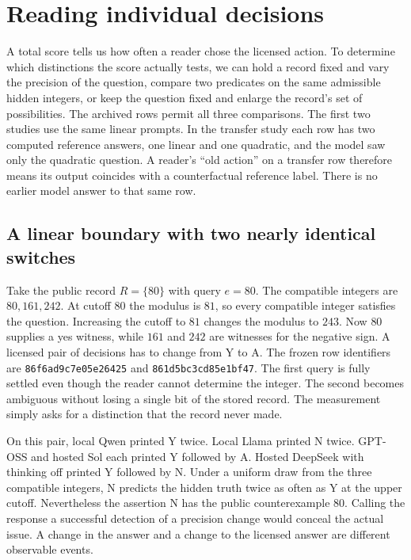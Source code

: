 \documentclass[12pt,letterpaper]{article}
\begin{document}
\section{Reading individual decisions}
\label{sec:reader-decisions}

A total score tells us how often a reader chose the licensed action. To determine which distinctions the score actually tests, we can hold a record fixed and vary the precision of the question, compare two predicates on the same admissible hidden integers, or keep the question fixed and enlarge the record's set of possibilities. The archived rows permit all three comparisons. The first two studies use the same linear prompts. In the transfer study each row has two computed reference answers, one linear and one quadratic, and the model saw only the quadratic question. A reader's “old action” on a transfer row therefore means its output coincides with a counterfactual reference label. There is no earlier model answer to that same row.

\subsection{A linear boundary with two nearly identical switches}

Take the public record $R=\{80\}$ with query $e=80$. The compatible integers are $80,161,242$. At cutoff $80$ the modulus is $81$, so every compatible integer satisfies the question. Increasing the cutoff to $81$ changes the modulus to $243$. Now $80$ supplies a yes witness, while $161$ and $242$ are witnesses for the negative sign. A licensed pair of decisions has to change from Y to A. The frozen row identifiers are \texttt{86f6ad9c7e05e26425} and \texttt{861d5bc3cd85e1bf47}. The first query is fully settled even though the reader cannot determine the integer. The second becomes ambiguous without losing a single bit of the stored record. The measurement simply asks for a distinction that the record never made.

On this pair, local Qwen printed Y twice. Local Llama printed N twice. GPT-OSS and hosted Sol each printed Y followed by A. Hosted DeepSeek with thinking off printed Y followed by N. Under a uniform draw from the three compatible integers, N predicts the hidden truth twice as often as Y at the upper cutoff. Nevertheless the assertion N has the public counterexample $80$. Calling the response a successful detection of a precision change would conceal the actual issue. A change in the answer and a change to the licensed answer are different observable events.
\end{document}

